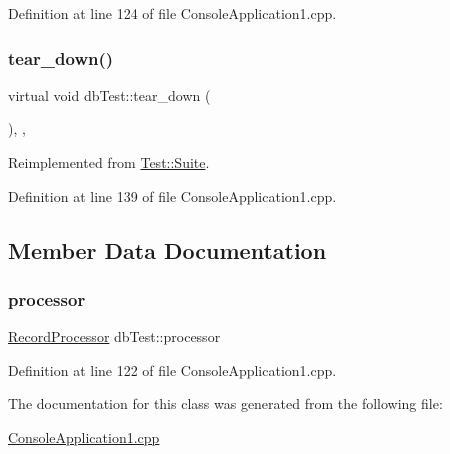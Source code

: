 Definition at line 124 of file Console\+Application1.\+cpp.

\mbox{\label{classdb_test_a1fa8de6f80f7578356b0f8feb8dcdd8f}} 
\subsubsection{\texorpdfstring{tear\+\_\+down()}{tear\_down()}}
{\footnotesize\ttfamily virtual void db\+Test\+::tear\+\_\+down (\begin{DoxyParamCaption}{ }\end{DoxyParamCaption})\hspace{0.3cm}{\ttfamily [inline]}, {\ttfamily [protected]}, {\ttfamily [virtual]}}



Reimplemented from \mbox{\hyperlink{class_test_1_1_suite_a2f2f180307180f8fdb0ca718a12047d0}{Test\+::\+Suite}}.



Definition at line 139 of file Console\+Application1.\+cpp.



\subsection{Member Data Documentation}
\mbox{\label{classdb_test_a9edd9165f54a1ad52545ebff71686735}} 
\subsubsection{\texorpdfstring{processor}{processor}}
{\footnotesize\ttfamily \mbox{\hyperlink{class_record_processor}{Record\+Processor}} db\+Test\+::processor\hspace{0.3cm}{\ttfamily [protected]}}



Definition at line 122 of file Console\+Application1.\+cpp.



The documentation for this class was generated from the following file\+:\begin{DoxyCompactItemize}
\item 
\mbox{\hyperlink{_console_application1_8cpp}{Console\+Application1.\+cpp}}\end{DoxyCompactItemize}
